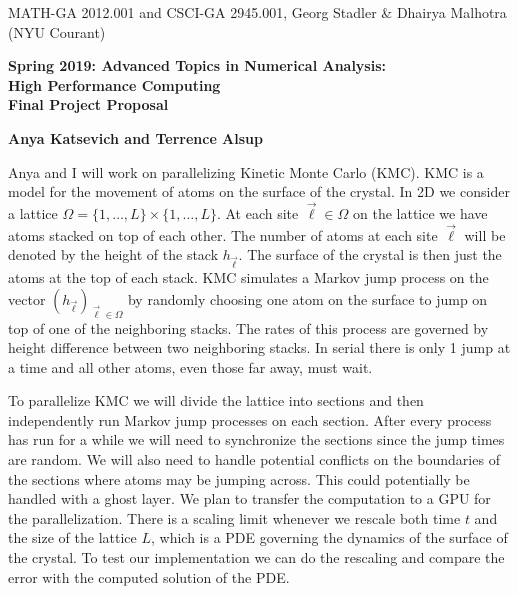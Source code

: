 \documentclass[12pt]{article}
\begin{document}
\begin{center}
  \vspace*{-2cm}
{\small MATH-GA 2012.001 and CSCI-GA 2945.001, Georg Stadler \&
  Dhairya Malhotra (NYU Courant)}
\end{center}
\vspace*{.5cm}
\begin{center}
\large \textbf{%
Spring 2019: Advanced Topics in Numerical Analysis: \\
High Performance Computing \\
Final Project Proposal }
\end{center}

\vspace*{0.4cm}
\begin{center}
\large \textbf{Anya Katsevich and Terrence Alsup}
\end{center}

\par Anya and I will work on parallelizing Kinetic Monte Carlo (KMC).  KMC is a model for the movement of atoms on the surface of the crystal.  In 2D we consider a lattice $\Omega = \{1,\ldots,L\} \times \{1,\ldots,L\}$.  At each site $\vec{\ell} \in \Omega$ on the lattice we have atoms stacked on top of each other.  The number of atoms at each site $\vec{\ell}$ will be denoted by the height of the stack $h_{\vec{\ell}}$.  The surface of the crystal is then just the atoms at the top of each stack.  KMC simulates a Markov jump process on the vector $(h_{\vec{\ell}})_{\vec{\ell} \in \Omega}$ by randomly choosing one atom on the surface to jump on top of one of the neighboring stacks.  The rates of this process are governed by height difference between two neighboring stacks.  In serial there is only 1 jump at a time and all other atoms, even those far away, must wait.\\

\par To parallelize KMC we will divide the lattice into sections and then independently run Markov jump processes on each section.  After every process has run for a while we will need to synchronize the sections since the jump times are random.  We will also need to handle potential conflicts on the boundaries of the sections where atoms may be jumping across.  This could potentially be handled with a ghost layer.  We plan to transfer the computation to a GPU for the parallelization.  There is a scaling limit whenever we rescale both time $t$ and the size of the lattice $L$, which is a PDE governing the dynamics of the surface of the crystal.  To test our implementation we can do the rescaling and compare the error with the computed solution of the PDE.
\end{document}

